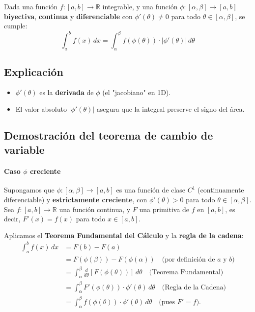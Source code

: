 \documentclass[12pt,a4paper]{article}
\begin{document}
Dada una función $f: [a, b] \to \mathbb{R}$ integrable, y una función $\phi: [\alpha, \beta] \to [a, b]$ \textbf{biyectiva}, \textbf{continua} y \textbf{diferenciable} con $\phi'(\theta) \neq 0$ para todo $\theta \in [\alpha, \beta]$, se cumple:
\[
\int_{a}^{b} f(x) \, dx = \int_{\alpha}^{\beta} f(\phi(\theta)) \cdot |\phi'(\theta)| \, d\theta
\]

\subsection*{Explicación}
\begin{itemize}
    \item $\phi'(\theta)$ es la \textbf{derivada} de $\phi$ (el "jacobiano" en 1D).
    \item El valor absoluto $|\phi'(\theta)|$ asegura que la integral preserve el signo del área.
\end{itemize}

\subsection{Demostración del teorema de cambio de variable}

\paragraph{Caso $\phi$ creciente}
Supongamos que $\phi: [\alpha, \beta] \to [a, b]$ es una función de clase $C^1$ (continuamente diferenciable) y \textbf{estrictamente creciente}, con $\phi'(\theta) > 0$ para todo $\theta \in [\alpha, \beta]$. Sea $f: [a, b] \to \mathbb{R}$ una función continua, y $F$ una primitiva de $f$ en $[a, b]$, es decir, $F'(x) = f(x)$ para todo $x \in [a, b]$.

Aplicamos el \textbf{Teorema Fundamental del Cálculo} y la \textbf{regla de la cadena}:
\begin{align*}
\int_{a}^{b} f(x) \, dx &= F(b) - F(a) \\
&= F(\phi(\beta)) - F(\phi(\alpha)) \quad \text{(por definición de $a$ y $b$)} \\
&= \int_{\alpha}^{\beta} \frac{d}{d\theta} [F(\phi(\theta))] \, d\theta \quad \text{(Teorema Fundamental)} \\
&= \int_{\alpha}^{\beta} F'(\phi(\theta)) \cdot \phi'(\theta) \, d\theta \quad \text{(Regla de la Cadena)} \\
&= \int_{\alpha}^{\beta} f(\phi(\theta)) \cdot \phi'(\theta) \, d\theta \quad \text{(pues $F' = f$)}.
\end{align*}
\end{document}

